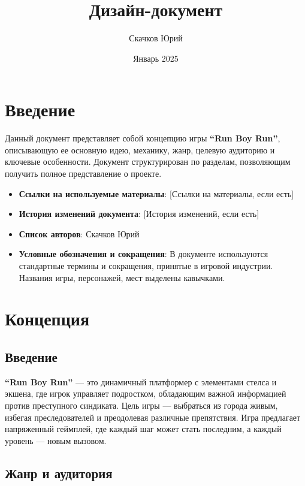 \documentclass[a4paper,12pt]{article}
\title{Дизайн-документ}
\author{Скачков Юрий}
\date{Январь 2025}
\begin{document}
\maketitle

\tableofcontents

\newpage

\section{Введение}

Данный документ представляет собой концепцию игры \textbf{``Run Boy Run''}, описывающую ее основную идею, механику, жанр, целевую аудиторию и ключевые особенности. Документ структурирован по разделам, позволяющим получить полное представление о проекте.

\begin{itemize}
    \item \textbf{Ссылки на используемые материалы}: [Ссылки на материалы, если есть]
    \item \textbf{История изменений документа}: [История изменений, если есть]
    \item \textbf{Список авторов}: Скачков Юрий
    \item \textbf{Условные обозначения и сокращения}: В документе используются стандартные термины и сокращения, принятые в игровой индустрии. Названия игры, персонажей, мест выделены кавычками.
\end{itemize}

\newpage

\section{Концепция}

\subsection{Введение}

\textbf{``Run Boy Run''} — это динамичный платформер с элементами стелса и экшена, где игрок управляет подростком, обладающим важной информацией против преступного синдиката. Цель игры — выбраться из города живым, избегая преследователей и преодолевая различные препятствия. Игра предлагает напряженный геймплей, где каждый шаг может стать последним, а каждый уровень — новым вызовом.

\subsection{Жанр и аудитория}
\end{document}

